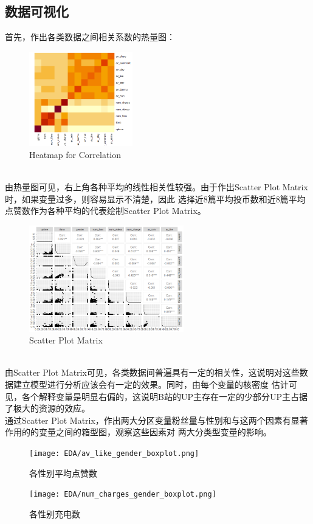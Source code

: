 \documentclass{ctexart}
\begin{document}
\subsection{数据可视化}
首先，作出各类数据之间相关系数的热量图：
\begin{figure}[htbp]
    \centering
    \includegraphics[width=0.40\textwidth]{EDA/Heatmap.png}
    \caption{Heatmap for Correlation}
\end{figure}\\
\indent 由热量图可见，右上角各种平均的线性相关性较强。由于作出Scatter Plot Matrix时，如果变量过多，则容易显示不清楚，因此
选择近8篇平均投币数和近8篇平均点赞数作为各种平均的代表绘制Scatter Plot Matrix。
\begin{figure}[htbp]
    \centering
    \includegraphics[width=0.60\textwidth]{EDA/Spm.png}
    \caption{Scatter Plot Matrix}
\end{figure}\\
\indent 由Scatter Plot Matrix可见，各类数据间普遍具有一定的相关性，这说明对这些数据建立模型进行分析应该会有一定的效果。同时，由每个变量的核密度
估计可见，各个解释变量是明显右偏的，这说明B站的UP主存在一定的少部分UP主占据了极大的资源的效应。\\
\indent 通过Scatter Plot Matrix，作出两大分区变量粉丝量与性别和与这两个因素有显著作用的的变量之间的箱型图，观察这些因素对
两大分类型变量的影响。
\begin{figure}[htbp]
    \centering
    \begin{minipage}[t]{0.48\textwidth}
        \centering
        \texttt{[image: EDA/av\_like\_gender\_boxplot.png]}
        \caption{各性别平均点赞数}
    \end{minipage}
    \begin{minipage}[t]{0.48\textwidth}
        \centering
        \texttt{[image: EDA/num\_charges\_gender\_boxplot.png]}
        \caption{各性别充电数}
    \end{minipage}
\end{figure}
\end{document}
